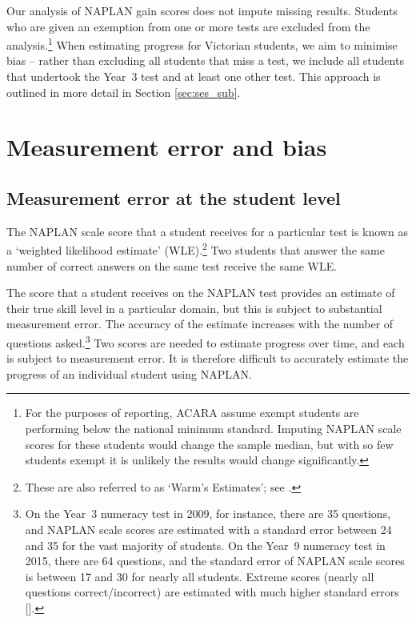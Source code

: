 Our analysis of NAPLAN gain scores does not impute missing results. Students who are given an exemption from one or more tests are excluded from the analysis.\footnote{For the purposes of reporting, ACARA assume exempt students are performing below the national minimum standard. Imputing NAPLAN scale scores for these students would change the sample median, but with so few students exempt it is unlikely the results would change significantly.} When estimating progress for Victorian students, we aim to minimise bias -- rather than excluding all students that miss a test, we include all students that undertook the \mbox{Year 3} test and at least one other test. This approach is outlined in more detail in Section \ref{sec:ses_sub}.

\section{Measurement error and bias}

\subsection{Measurement error at the student level}

The NAPLAN scale score that a student receives for a particular test is known as a `weighted likelihood estimate' (WLE).\footnote{These are also referred to as `Warm's Estimates'; see \textcite{warm1989}.} Two students that answer the same number of correct answers on the same test receive the same WLE.

The score that a student receives on the NAPLAN test provides an estimate of their true skill level in a particular domain, but this is subject to substantial measurement error. The accuracy of the estimate increases with the number of questions asked.\footnote{On the \mbox{Year 3} numeracy test in 2009, for instance, there are 35 questions, and NAPLAN scale scores are estimated with a standard error between 24 and 35 for the vast majority of students. On the \mbox{Year 9} numeracy test in 2015, there are 64 questions, and the standard error of NAPLAN scale scores is between 17 and 30 for nearly all students. Extreme scores (nearly all questions correct/incorrect) are estimated with much higher standard errors [\textcite{acara2015d}].} Two scores are needed to estimate progress over time, and each is subject to measurement error. It is therefore difficult to accurately estimate the progress of an individual student using NAPLAN.

